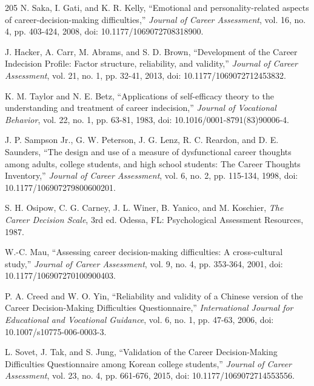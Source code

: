 \begin{thebibliography}{205}
 N. Saka, I. Gati, and K. R. Kelly, ``Emotional and personality-\allowbreak{}related aspects of career-\allowbreak{}decision-\allowbreak{}making difficulties,'' \textit{Journal of Career Assessment}, vol. 16, no. 4, pp. 403-424, 2008, doi: 10.\allowbreak{}1177/\allowbreak{}1069072708318900.

 J. Hacker, A. Carr, M. Abrams, and S. D. Brown, ``Development of the Career Indecision Profile: Factor structure, reliability, and validity,'' \textit{Journal of Career Assessment}, vol. 21, no. 1, pp. 32-41, 2013, doi: 10.\allowbreak{}1177/\allowbreak{}1069072712453832.

 K. M. Taylor and N. E. Betz, ``Applications of self-\allowbreak{}efficacy theory to the understanding and treatment of career indecision,'' \textit{Journal of Vocational Behavior}, vol. 22, no. 1, pp. 63-81, 1983, doi: 10.\allowbreak{}1016/\allowbreak{}0001-\allowbreak{}8791(83)90006-\allowbreak{}4.

 J. P. Sampson Jr., G. W. Peterson, J. G. Lenz, R. C. Reardon, and D. E. Saunders, ``The design and use of a measure of dysfunctional career thoughts among adults, college students, and high school students: The Career Thoughts Inventory,'' \textit{Journal of Career Assessment}, vol. 6, no. 2, pp. 115-134, 1998, doi: 10.\allowbreak{}1177/\allowbreak{}106907279800600201.

 S. H. Osipow, C. G. Carney, J. L. Winer, B. Yanico, and M. Koschier, \textit{The Career Decision Scale}, 3rd ed. Odessa, FL: Psychological Assessment Resources, 1987.

 W.-C. Mau, ``Assessing career decision-\allowbreak{}making difficulties: A cross-\allowbreak{}cultural study,'' \textit{Journal of Career Assessment}, vol. 9, no. 4, pp. 353-364, 2001, doi: 10.\allowbreak{}1177/\allowbreak{}106907270100900403.

 P. A. Creed and W. O. Yin, ``Reliability and validity of a Chinese version of the Career Decision-\allowbreak{}Making Difficulties Questionnaire,'' \textit{International Journal for Educational and Vocational Guidance}, vol. 6, no. 1, pp. 47-63, 2006, doi: 10.\allowbreak{}1007/\allowbreak{}s10775-\allowbreak{}006-\allowbreak{}0003-\allowbreak{}3.

 L. Sovet, J. Tak, and S. Jung, ``Validation of the Career Decision-\allowbreak{}Making Difficulties Questionnaire among Korean college students,'' \textit{Journal of Career Assessment}, vol. 23, no. 4, pp. 661-676, 2015, doi: 10.\allowbreak{}1177/\allowbreak{}1069072714553556.


\end{thebibliography}
